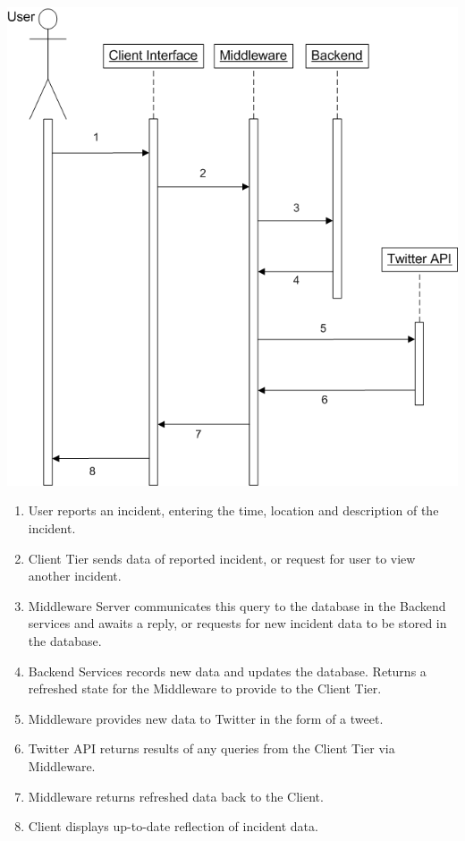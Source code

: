 \documentclass{sig-alt-release2}
\begin{document}
\includegraphics[scale=0.3]{img/3.png}

\begin{enumerate}
\item    User reports an incident, entering the time, location and description of the incident.
\item    Client Tier sends data of reported incident, or request for user to view another incident.
\item    Middleware Server communicates this query to the database in the Backend services and awaits a reply, or requests for new incident data to be stored in the database.
\item    Backend Services records new data and updates the database. Returns a refreshed state for the Middleware to provide to the Client Tier.
\item    Middleware provides new data to Twitter in the form of a tweet.
\item    Twitter API returns results of any queries from the Client Tier via Middleware.
\item    Middleware returns refreshed data back to the Client.
\item    Client displays up-to-date reflection of incident data.
\end{enumerate}
\end{document}
